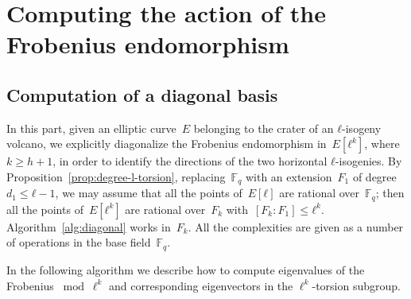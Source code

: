 \documentclass{lms}
\begin{document}
\section{Computing the action of the Frobenius endomorphism}
\label{sec:acti-frob-endm}
\subsection{Computation of a diagonal basis}
\label{ss:diagonal}

In this part, given an elliptic curve~$E$ belonging to the crater
of an $ℓ$-isogeny volcano, we explicitly diagonalize the Frobenius endomorphism
in~$E[ℓ^k]$, where $k ≥ h+1$,
in order to identify the directions of the two horizontal $ℓ$-isogenies.
By Proposition~\ref{prop:degree-l-torsion},
replacing~$\mathbb F_q$ with an extension~$F_1$ of degree~$d_1 ≤ ℓ - 1$,
we may assume that all the points of~$E[ℓ]$ are rational over~$\mathbb F_q$;
then all the points of~$E[ℓ^k]$ are rational over~$F_k$ with~$[F_k:F_1] ≤ ℓ^k$.
Algorithm~\ref{alg:diagonal} works in~$F_k$.
All the complexities are given as a number of
operations in the base field~$\mathbb F_q$.

In the following algorithm we describe how to compute eigenvalues of
the Frobenius $\bmod \ell^k$ and
corresponding eigenvectors in the $\ell^{k}$-torsion subgroup.
\end{document}
